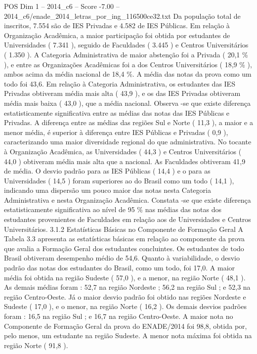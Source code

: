 \begin{textsample}{POS Dim 1 – 2014\_c6 – Score -7.00 – 2014\_c6/enade\_2014\_letras\_por\_ing\_116500ce32.txt}
Da população total de inscritos, 7.554 são de IES Privadas e 4.582 de IES Públicas.
Em relação à Organização Acadêmica, a maior participação foi obtida por estudantes de Universidades ( 7.341 ), seguido de Faculdades ( 3.445 ) e Centros Universitários ( 1.350 ).
A Categoria Administrativa de maior abstenção foi a Privada ( 20,1 \% ), e entre as Organizações Acadêmicas foi a dos Centros Universitários ( 18,9 \% ), ambos acima da média nacional de 18,4 \%.
A média das notas da prova como um todo foi 43,6.
Em relação à Categoria Administrativa, os estudantes das IES Privadas obtiveram média mais alta ( 43,9 ), e os das IES Privadas obtiveram média mais baixa ( 43,0 ), que a média nacional.
Observa -se que existe diferença estatisticamente significativa entre as médias das notas das IES Públicas e Privadas.
A diferença entre as médias das regiões Sul e Norte ( 11,3 ), a maior e a menor média, é superior à diferença entre IES Públicas e Privadas ( 0,9 ), caracterizando uma maior diversidade regional do que administrativa.
No tocante à Organização Acadêmica, as Universidades ( 44,3 ) e Centros Universitários ( 44,0 ) obtiveram média mais alta que a nacional.
As Faculdades obtiveram 41,9 de média.
O desvio padrão para as IES Públicas ( 14,4 ) e o para as Universidades ( 14,5 ) foram superiores ao do Brasil como um todo ( 14,1 ), indicando uma dispersão um pouco maior das notas nesta Categoria Administrativa e nesta Organização Acadêmica.
Constata -se que existe diferença estatisticamente significativa ao nível de 95 \% nas médias das notas dos estudantes provenientes de Faculdades em relação aos de Universidades e Centros Universitários. 3.1.2 Estatísticas Básicas no Componente de Formação Geral A Tabela 3.3 apresenta as estatísticas básicas em relação ao componente da prova que avalia a Formação Geral dos estudantes concluintes.
Os estudantes de todo Brasil obtiveram desempenho médio de 54,6.
Quanto à variabilidade, o desvio padrão das notas dos estudantes do Brasil, como um todo, foi 17,0.
A maior média foi obtida na região Sudeste ( 57,0 ), e a menor, na região Norte ( 48,1 ).
As demais médias foram : 52,7 na região Nordeste ; 56,2 na região Sul ; e 52,3 na região Centro-Oeste.
Já o maior desvio padrão foi obtido nas regiões Nordeste e Sudeste ( 17,0 ), e o menor, na região Norte ( 16,2 ).
Os demais desvios padrões foram : 16,5 na região Sul ; e 16,7 na região Centro-Oeste.
A maior nota no Componente de Formação Geral da prova do ENADE/2014 foi 98,8, obtida por, pelo menos, um estudante na região Sudeste.
A menor nota máxima foi obtida na região Norte ( 91,8 ).

\end{textsample}
